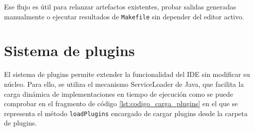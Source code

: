 \documentclass[../../main.tex]{subfiles}
\begin{document}
Ese flujo es útil para relanzar artefactos existentes, probar salidas generadas manualmente o ejecutar resultados de \lstinline|Makefile| sin depender del editor activo.

\section{Sistema de plugins}




El sistema de plugins permite extender la funcionalidad del IDE sin modificar su núcleo. Para ello, se utiliza el mecanismo ServiceLoader de Java, que facilita la carga dinámica de implementaciones en tiempo de ejecución como se puede comprobar en el fragmento de código \ref{lst:codigo_carga_plugins} en el que se representa el método \lstinline|loadPlugins| encargado de cargar plugins desde la carpeta de plugins.
\end{document}
